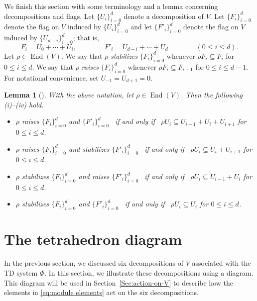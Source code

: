 \documentclass[11pt]{article}%
\theoremstyle{definition}
\theoremstyle{plain}
\newtheorem{lemma}[definition]{Lemma}
\begin{document}
\smallskip
We finish this section with some terminology and a lemma concerning decompositions and flags.
Let $\{U_i\}_{i=0}^d$ denote a decomposition of $V$.
Let $\{F_i\}_{i=0}^d$ denote the flag on $V$ induced by $\{U_i\}_{i=0}^d$ and let $\{F'_i\}_{i=0}^d$ denote the flag on $V$ induced by $\{U_{d-i}\}_{i=0}^d$; that is,
$$
	F_i = U_0 + \cdots + U_i, \qquad \qquad
	F'_i = U_{d-i} + \cdots + U_d \qquad \qquad
	(0 \leq i \leq d).
$$
Let $\rho \in \operatorname{End}(V)$.
We say that $\rho$ \emph{stabilizes} $\{F_i\}_{i=0}^d$ whenever $\rho F_i \subseteq F_i$ for $0 \leq i \leq d$.
We say that $\rho$ \emph{raises} $\{F_i\}_{i=0}^d$ whenever $\rho F_i \subseteq F_{i+1}$ for $0 \leq i \leq d-1$.
For notational convenience, set $U_{-1}=U_{d+1}=0$.


\begin{lemma}[{\cite[Lemmas~6.3--6.6]{2023TerJCTA}}]\label{lem:raise,stabilizes}
With the above notation, let $\rho \in \operatorname{End}(V)$. 
Then the following {\rm(i)}--{\rm(iv)} hold.
\begin{itemize}
\item[\rm(i)] $\rho$ raises $\{F_i\}_{i=0}^d$ and $\{F'_i\}_{i=0}^d$ 
	\ if and only if \ $\rho U_i \subseteq U_{i-1} + U_i + U_{i+1}$ for $0 \leq i \leq d$.
\item[\rm(ii)] $\rho$ raises $\{F_i\}_{i=0}^d$ and stabilizes $\{F'_i\}_{i=0}^d$ 
	\ if and only if \  $\rho U_i \subseteq U_i + U_{i+1}$ for $0 \leq i \leq d$.
\item[\rm(iii)] $\rho$ stabilizes $\{F_i\}_{i=0}^d$ and raises $\{F'_i\}_{i=0}^d$ 
	\ if and only if \  $\rho U_i \subseteq U_{i-1} + U_{i}$ for $0 \leq i \leq d$.
\item[\rm(iv)] $\rho$ stabilizes $\{F_i\}_{i=0}^d$ and $\{F'_i\}_{i=0}^d$ 
	\ if and only if \  $\rho U_i \subseteq U_{i}$ for $0 \leq i \leq d$.
\end{itemize}
\end{lemma}




\section{The tetrahedron diagram}\label{Sec:decomp-diag}
In the previous section, we discussed six decompositions of $V$ associated with the TD system $\Phi$.
In this section, we illustrate these decompositions using a diagram.
This diagram will be used in Section~\ref{Sec:action-on-V} to describe how the elements in \eqref{eq:module elements} act on the six decompositions.
\end{document}
